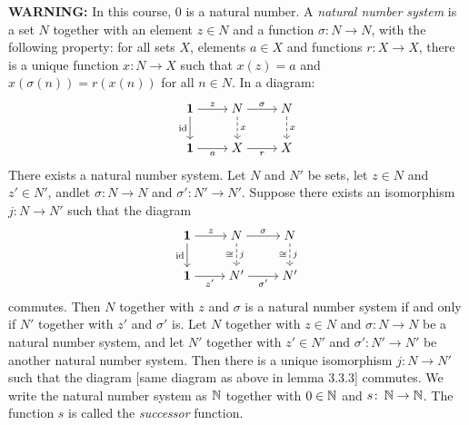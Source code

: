 \linebreak\textbf{WARNING:} In this course, $0$ is a natural number.
 A \textit{natural number system} is a set $N$ together with an element $z \in N$ and a function $\sigma \colon N \to N$, with the following property: for all sets $X$, elements $a \in X$ and functions $r \colon X \to X$, there is a unique function $x \colon N \to X$ such that $x(z) = a$ and $x(\sigma(n)) = r(x(n))$ for all $n \in N$. In a diagram:
\[\begin{tikzcd}[cramped]
	{\mathbf{1}} & N & N \\
	{\mathbf{1}} & X & X
	\arrow["z", from=1-1, to=1-2]
	\arrow["{\text{id}}"', from=1-1, to=2-1]
	\arrow["\sigma", from=1-2, to=1-3]
	\arrow["x", dashed, from=1-2, to=2-2]
	\arrow["x", dashed, from=1-3, to=2-3]
	\arrow["a"', from=2-1, to=2-2]
	\arrow["r"', from=2-2, to=2-3]
\end{tikzcd}\]
 There exists a natural number system.
 Let $N$ and $N'$ be sets, let $z \in N$ and $z' \in N'$, andlet $\sigma \colon N \to N$ and $\sigma' \colon N' \to N'$. Suppose there exists an isomorphism $j \colon N \to N'$ such that the diagram
\[\begin{tikzcd}[cramped]
	{\mathbf{1}} & N & N \\
	{\mathbf{1}} & {N'} & {N'}
	\arrow["z", from=1-1, to=1-2]
	\arrow["{\text{id}}"', from=1-1, to=2-1]
	\arrow["\sigma", from=1-2, to=1-3]
	\arrow["j", "\cong"', dashed, from=1-2, to=2-2]
	\arrow["j", "\cong"', dashed, from=1-3, to=2-3]
	\arrow["{z'}"', from=2-1, to=2-2]
	\arrow["{\sigma'}"', from=2-2, to=2-3]
\end{tikzcd}\]
commutes. Then $N$ together with $z$ and $\sigma$ is a natural number system if and only if $N'$ together with $z'$ and $\sigma'$ is.
 Let $N$ together with $z \in N$ and $\sigma \colon N \to N$ be a natural number system, and let $N'$ together with $z' \in N'$ and $\sigma' \colon N' \to N'$ be another natural number system. Then there is a unique isomorphism $j \colon N \to N'$ such that the diagram [same diagram as above in lemma 3.3.3] commutes.
 We write the natural number system as $\operatorname{\mathbb{N}}$ together with $0 \in \operatorname{\mathbb{N}}$ and $s \colon \operatorname{\mathbb{N}} \to \operatorname{\mathbb{N}}$. The function $s$ is called the \textit{successor} function.